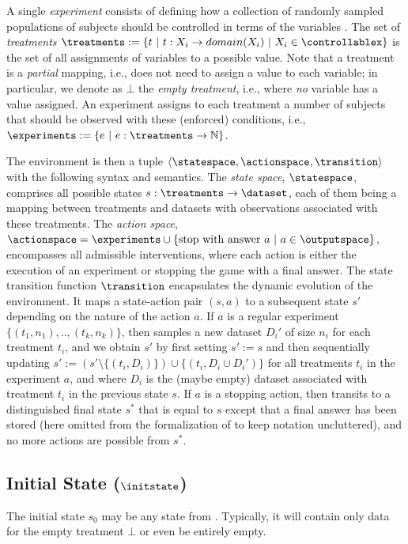 \documentclass{article}
\begin{document}
        A single \emph{experiment} consists of defining how a collection of randomly sampled populations of subjects should be controlled in terms of the variables \varset.
        The set of \emph{treatments} $\treatments := \{t~|~t:X_i \rightarrow domain(X_i)~|~X_i \in \controllablex\}$ is the set of all assignments of variables to a possible value.
        Note that a treatment is a \emph{partial} mapping, i.e., does not need to assign a value to each variable; in particular, we denote as $\bot$ the \emph{empty treatment}, i.e., where \emph{no} variable has a value assigned.
        An experiment assigns to each treatment a number of subjects that should be observed with these (enforced) conditions, i.e., $\experiments := \{e~|~ e: \treatments \rightarrow \mathbb{N}\}$.


        The environment is then a tuple $\langle \statespace, \actionspace, \transition \rangle$ with the following syntax and semantics.
        The \emph{state space}, $\statespace$, comprises all possible states $s: \treatments \rightarrow \dataset$, each of them being a mapping between treatments and datasets with observations associated with these treatments. 
        The \emph{action space}, $\actionspace = \experiments \cup \{\text{stop with answer } a ~|~ a \in \outputspace\}$, encompasses all admissible interventions, where each action is either the execution of an experiment or stopping the game with a final answer.
        The state transition function $\transition$ encapsulates the dynamic evolution of the environment. 
        It maps a state-action pair $(s, a)$ to a subsequent state $s'$ depending on the nature of the action $a$.
        If $a$ is a regular experiment $\{(t_1, n_1),..,(t_k,n_k)\}$, then \transition samples a new dataset $D_i'$ of size $n_i$ for each treatment $t_i$, and we obtain $s'$ by first setting $s' := s$ and then sequentially updating $s' := (s' \setminus \{(t_i, D_i)\}) \cup \{(t_i, D_i \cup D_i')\}$ for all treatments $t_i$ in the experiment $a$, and where $D_i$ is the (maybe empty) dataset associated with treatment $t_i$ in the previous state $s$.
        If $a$ is a stopping action, then \transition transits to a distinguished final state $s^*$ that is equal to $s$ except that a final answer has been stored (here omitted from the formalization of \statespace to keep notation uncluttered), and no more actions are possible from $s^*$.
        


    \subsection{Initial State ($\initstate$)}
        The initial state $s_0$ may be any state from \statespace.
        Typically, it will contain only data for the empty treatment $\bot$ or even be entirely empty.
\end{document}
